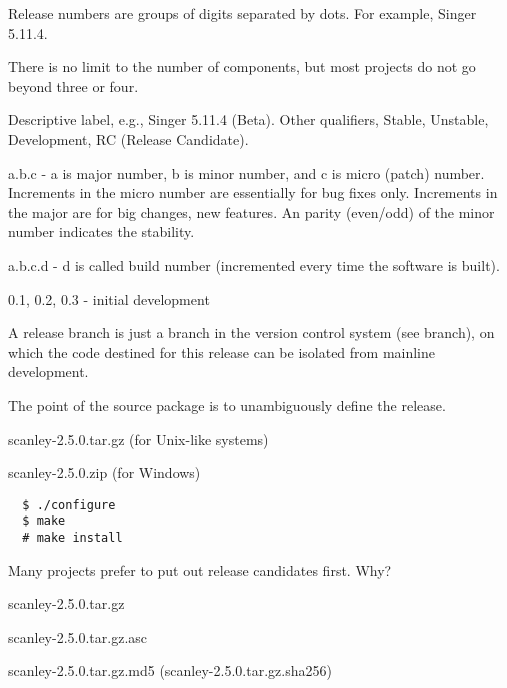 \documentclass[landscape,30pt]{foils}
\begin{document}
Release numbers are groups of digits separated by dots.  For example, Singer 5.11.4.

There is no limit to the number of components, but most projects do not go beyond three or four. 

Descriptive label, e.g., Singer 5.11.4 (Beta).  Other qualifiers, Stable, Unstable, Development, RC (Release Candidate).

a.b.c - a is major number,  b is minor number, and c is micro (patch) number.  Increments in the micro number  are essentially for bug fixes only. Increments in the major are for big changes, new features.   An parity (even/odd) of the minor number indicates the stability.


a.b.c.d - d is called build number (incremented every time the software is built).

0.1, 0.2, 0.3 -  initial development




A release branch is just a branch in the version control system (see branch), on which the code destined for this release can be isolated from mainline development. 


The point of the source package is to unambiguously define the release.

scanley-2.5.0.tar.gz (for Unix-like systems)

scanley-2.5.0.zip (for Windows)

\newpage
\begin{verbatim}
  $ ./configure
  $ make
  # make install
\end{verbatim}


Many projects prefer to put out release candidates first.  Why?


scanley-2.5.0.tar.gz

scanley-2.5.0.tar.gz.asc

scanley-2.5.0.tar.gz.md5 (scanley-2.5.0.tar.gz.sha256)
\end{document}
